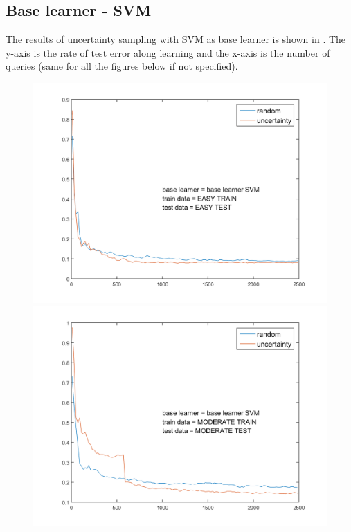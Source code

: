 \documentclass{article}
\begin{document}
\subsection{Base learner - SVM}

The results of uncertainty sampling with SVM as base learner is shown in . The y-axis is the rate of test error along learning and the x-axis is the number of queries (same for all the figures below if not specified).
  \begin{figure}[h]
    \begin{minipage}{.31\textwidth}
      \centering
      \includegraphics[width=1\linewidth]{../svm_simple}
    \end{minipage}
    \hfill
    \begin{minipage}{.31\textwidth}
      \centering
      \includegraphics[width=1\linewidth]{../svm_moderate}

\end{minipage}
\end{figure}
\end{document}

